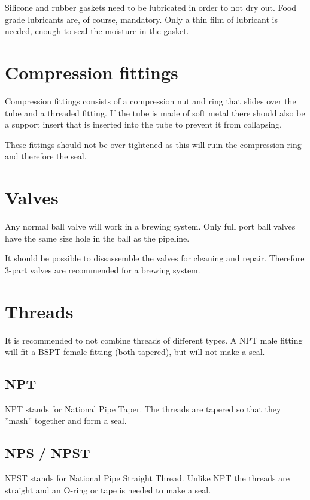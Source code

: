 \documentclass[11pt,fleqn,openany]{book} %
\begin{document}
Silicone and rubber gaskets need to be lubricated in order to not dry out. Food grade lubricants are, of course, mandatory. Only a thin film of lubricant is needed, enough to seal the moisture in the gasket.

\section{Compression fittings}

Compression fittings consists of a compression nut and ring that slides over the tube and a threaded fitting. If the tube is made of soft metal there should also be a support insert that is inserted into the tube to prevent it from collapsing.

These fittings should not be over tightened as this will ruin the compression ring and therefore the seal.

\section{Valves}

Any normal ball valve will work in a brewing system. Only full port ball valves have the same size hole in the ball as the pipeline.

It should be possible to dissassemble the valves for cleaning and repair. Therefore 3-part valves are recommended for a brewing system.

\section{Threads}

It is recommended to not combine threads of different types. A NPT male fitting will fit a BSPT female fitting (both tapered), but will not make a seal.

\subsection{NPT}

NPT stands for National Pipe Taper. The threads are tapered so that they ''mash'' together and form a seal.

\subsection{NPS / NPST}

NPST stands for National Pipe Straight Thread. Unlike NPT the threads are straight and an O-ring or tape is needed to make a seal.
\end{document}
